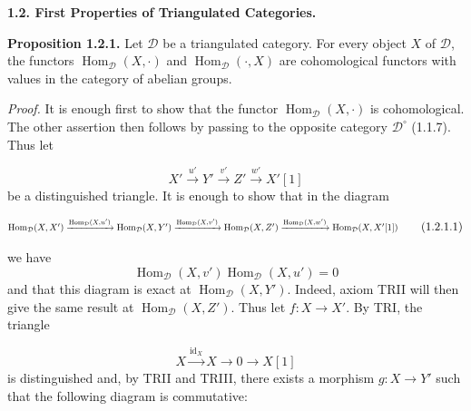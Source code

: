 %
\begingroup
\small
\setlength{\abovedisplayskip}{4pt plus 2pt minus 2pt}%
\setlength{\belowdisplayskip}{4pt plus 2pt minus 2pt}%

\medskip
\noindent\textbf{1.2. First Properties of Triangulated Categories.}

\medskip
\noindent\textbf{Proposition 1.2.1.}\quad
Let $\mathcal D$ be a triangulated category. For every object $X$ of
$\mathcal D$, the functors $\operatorname{Hom}_{\mathcal D}(X,\mathord\cdot)$
and $\operatorname{Hom}_{\mathcal D}(\mathord\cdot,X)$ are cohomological
functors with values in the category of abelian groups.

\noindent\emph{Proof.}\quad
It is enough first to show that the functor
$\operatorname{Hom}_{\mathcal D}(X,\mathord\cdot)$ is cohomological. The
other assertion then follows by passing to the opposite category
$\mathcal D^\circ$ (1.1.7). Thus let

\[
  X'\xrightarrow{u'}Y'\xrightarrow{v'}Z'\xrightarrow{w'}X'[1]
\]
be a distinguished triangle. It is enough to show that in the diagram

\begin{equation}
  \resizebox{0.98\linewidth}{!}{$
    \operatorname{Hom}_{\mathcal D}(X,X')
    \xrightarrow{\operatorname{Hom}_{\mathcal D}(X,u')}
    \operatorname{Hom}_{\mathcal D}(X,Y')
    \xrightarrow{\operatorname{Hom}_{\mathcal D}(X,v')}
    \operatorname{Hom}_{\mathcal D}(X,Z')
    \xrightarrow{\operatorname{Hom}_{\mathcal D}(X,w')}
    \operatorname{Hom}_{\mathcal D}(X,X'[1])
  $}
  \tag{1.2.1.1}
\end{equation}

we have
\[
  \operatorname{Hom}_{\mathcal D}(X,v')
  \operatorname{Hom}_{\mathcal D}(X,u')=0
\]
and that this diagram is exact at $\operatorname{Hom}_{\mathcal D}(X,Y')$.
Indeed, axiom TRII will then give the same result at
$\operatorname{Hom}_{\mathcal D}(X,Z')$. Thus let
$f\colon X\longrightarrow X'$. By TRI, the triangle

\[
  X\xrightarrow{\operatorname{id}_X}X\longrightarrow0\longrightarrow X[1]
\]
is distinguished and, by TRII and TRIII, there exists a morphism
$g\colon X\longrightarrow Y'$ such that the following diagram is commutative:

